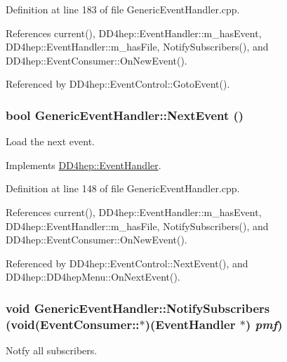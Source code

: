 Definition at line 183 of file GenericEventHandler.cpp.

References current(), DD4hep::EventHandler::m\_\-hasEvent, DD4hep::EventHandler::m\_\-hasFile, NotifySubscribers(), and DD4hep::EventConsumer::OnNewEvent().

Referenced by DD4hep::EventControl::GotoEvent().\hypertarget{class_d_d4hep_1_1_generic_event_handler_a0dc8d4d5dde63d3278f67da79e86b590}{
\subsubsection[{NextEvent}]{\setlength{\rightskip}{0pt plus 5cm}bool GenericEventHandler::NextEvent ()}}
\label{class_d_d4hep_1_1_generic_event_handler_a0dc8d4d5dde63d3278f67da79e86b590}


Load the next event. 

Implements \hyperlink{class_d_d4hep_1_1_event_handler_ac2360791d3a44f4cef0987f9a7ec51ce}{DD4hep::EventHandler}.

Definition at line 148 of file GenericEventHandler.cpp.

References current(), DD4hep::EventHandler::m\_\-hasEvent, DD4hep::EventHandler::m\_\-hasFile, NotifySubscribers(), and DD4hep::EventConsumer::OnNewEvent().

Referenced by DD4hep::EventControl::NextEvent(), and DD4hep::DD4hepMenu::OnNextEvent().\hypertarget{class_d_d4hep_1_1_generic_event_handler_a01e7a0bdb965b93d5a3b0ba8f9ccb85e}{
\subsubsection[{NotifySubscribers}]{\setlength{\rightskip}{0pt plus 5cm}void GenericEventHandler::NotifySubscribers (void(EventConsumer::$\ast$)({\bf EventHandler} $\ast$) {\em pmf})}}
\label{class_d_d4hep_1_1_generic_event_handler_a01e7a0bdb965b93d5a3b0ba8f9ccb85e}


Notfy all subscribers. 

